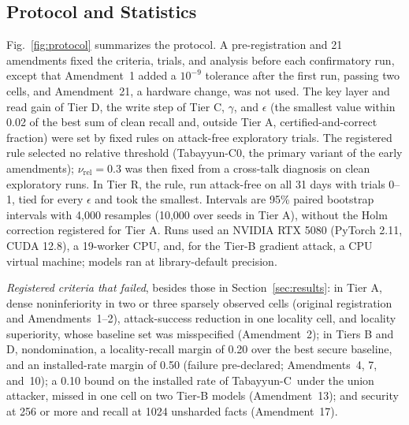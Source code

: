 \documentclass[journal]{IEEEtran}
\theoremstyle{remark}
\newcommand{\TabC}{\mbox{Tabayyun-C}}
\begin{document}
\subsection{Protocol and Statistics}
Fig.~\ref{fig:protocol} summarizes the protocol. A pre-registration and 21 amendments fixed the criteria, trials, and analysis before each confirmatory run, except that Amendment~1 added a $10^{-9}$ tolerance after the first run, passing two cells, and Amendment~21, a hardware change, was not used. The key layer and read gain of Tier D, the write step of Tier C, $\gamma$, and $\epsilon$ (the smallest value within 0.02 of the best sum of clean recall and, outside Tier A, certified-and-correct fraction) were set by fixed rules on attack-free exploratory trials. The registered rule selected no relative threshold (\TabC0, the primary variant of the early amendments); $\nu_{\mathrm{rel}}=0.3$ was then fixed from a cross-talk diagnosis on clean exploratory runs. In Tier R, the rule, run attack-free on all 31 days with trials 0--1, tied for every $\epsilon$ and took the smallest. Intervals are 95\% paired bootstrap intervals with 4,000 resamples (10,000 over seeds in Tier A), without the Holm correction registered for Tier A. Runs used an NVIDIA RTX 5080 (PyTorch 2.11, CUDA 12.8), a 19-worker CPU, and, for the Tier-B gradient attack, a CPU virtual machine; models ran at library-default precision.

\emph{Registered criteria that failed}, besides those in Section~\ref{sec:results}: in Tier A, dense noninferiority in two or three sparsely observed cells (original registration and Amendments~1--2), attack-success reduction in one locality cell, and locality superiority, whose baseline set was misspecified (Amendment~2); in Tiers B and D, nondomination, a locality-recall margin of 0.20 over the best secure baseline, and an installed-rate margin of 0.50 (failure pre-declared; Amendments~4, 7, and~10); a 0.10 bound on the installed rate of \TabC\ under the union attacker, missed in one cell on two Tier-B models (Amendment~13); and security at 256 or more and recall at 1024 unsharded facts (Amendment~17).
\end{document}
